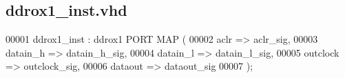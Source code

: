 \subsection{ddrox1\+\_\+inst.\+vhd}
\label{ddrox1__inst_8vhd_source}

\begin{DoxyCode}
00001 ddrox1\_inst : ddrox1 \textcolor{keywordflow}{PORT} \textcolor{keywordflow}{MAP} (
00002         aclr     => aclr\_sig,
00003         datain_h     => datain\_h\_sig,
00004         datain_l     => datain\_l\_sig,
00005         outclock     => outclock\_sig,
00006         dataout  => dataout\_sig
00007     \textcolor{vhdlchar}{)};
\end{DoxyCode}
